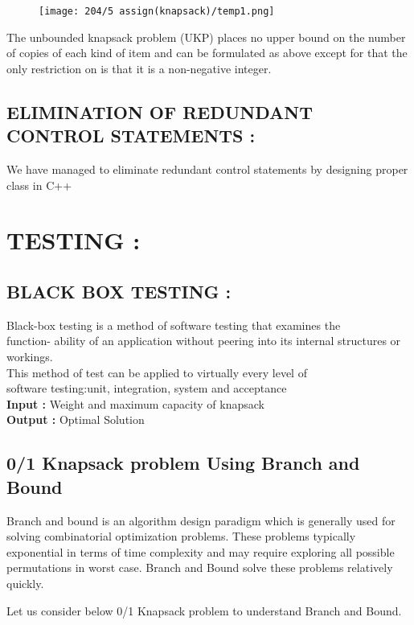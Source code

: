\documentclass{article}
\begin{document}
	\begin{figure}[h!]
		\centering
		\texttt{[image: 204/5 assign(knapsack)/temp1.png]}
	\end{figure}
	
	The unbounded knapsack problem (UKP) places no upper bound on the number of copies of each kind of item and can be formulated as above except for that the only restriction on  is that it is a non-negative integer.\\
	
	
	
	\subsection{ELIMINATION OF REDUNDANT CONTROL STATEMENTS : } We have managed to eliminate redundant control statements by designing proper class in C++
	
	\section{TESTING :}
	
	\subsection{BLACK BOX TESTING : }
	Black-box testing is a method of software testing that examines the\\ function- ability of an application without peering into its internal structures or workings.\\
	This method of test can be applied to virtually every level of\\ software testing:unit, integration, system and acceptance\\
	\textbf{Input :}   Weight and maximum capacity of knapsack\\
	\textbf{Output :} Optimal Solution
	
	
	\subsection{ 0/1 Knapsack problem Using Branch and Bound  }
	Branch and bound is an algorithm design paradigm which is generally used for solving combinatorial optimization problems. These problems typically exponential in terms of time complexity and may require exploring all possible permutations in worst case. Branch and Bound solve these problems relatively quickly.
	
	Let us consider below 0/1 Knapsack problem to understand Branch and Bound.
	
\end{document}
